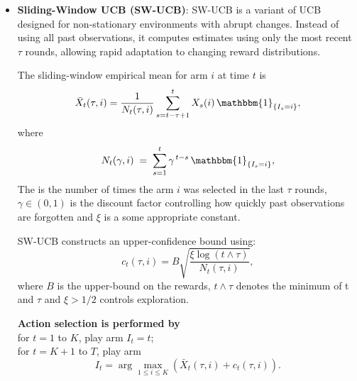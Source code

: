 \documentclass[pdflatex,sn-mathphys-num]{sn-jnl}
\theoremstyle{thmstyleone}%
\theoremstyle{thmstyletwo}%
\theoremstyle{thmstylethree}%
\begin{document}
\begin{itemize}


    \item \textbf{Sliding-Window UCB (SW-UCB)}\cite{swucb}:  
    SW-UCB is a variant of UCB designed for non-stationary environments with abrupt changes.  
    Instead of using all past observations, it computes estimates using only the most recent $\tau$ rounds, 
    allowing rapid adaptation to changing reward distributions.  

    The sliding-window empirical mean for arm $i$ at time $t$ is  
    \[
        \bar{X}_t(\tau, i)
        = \frac{1}{N_t(\tau, i)}
        \sum_{s = t-\tau+1}^{t} X_s(i)\,\mathbbm{1}_{\{I_s = i\}},
    \]
    where  
    \[
    N_t(\gamma,i) \;=\; \sum_{s=1}^{t} \gamma^{\,t-s}\,\mathbbm{1}_{\{I_s = i\}},
    \]
 The is the number of times the arm $i$ was selected in the last $\tau$ rounds, $\gamma \in (0,1)$ is the discount factor controlling how quickly past observations are forgotten and $\xi$ is a some appropriate constant.

    SW-UCB constructs an upper-confidence bound using:  
    \[
        c_t(\tau, i)
        = B \sqrt{\frac{\xi \log (t \wedge \tau)}{N_t(\tau, i)}},
    \]
    where $B$ is the upper-bound on the rewards, $t \wedge \tau$ denotes the minimum of t and $\tau$ and $\xi > 1/2$ controls exploration.

    \textbf{Action selection is performed by}\\
\quad for $t = 1$ to $K$, play arm $I_t = t$;\\
\quad for $t = K+1$ to $T$, play arm
\[
    I_t
    = \arg\max_{1 \le i \le K}
    \left(
        \bar{X}_t(\tau,i) + c_t(\tau,i)
    \right).
\]


\end{itemize}
\end{document}
